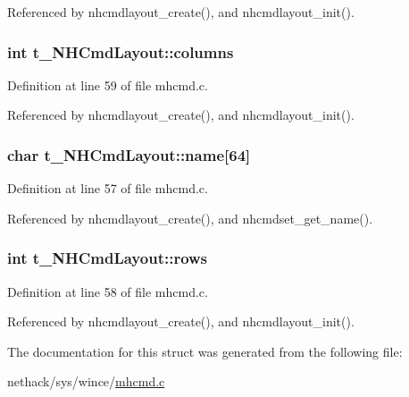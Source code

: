Referenced by nhcmdlayout\+\_\+create(), and nhcmdlayout\+\_\+init().

\hypertarget{structt__NHCmdLayout_ae49b667aa9339a89e4bc0d15881506ca}{
\subsubsection[{columns}]{\setlength{\rightskip}{0pt plus 5cm}int t\+\_\+\+N\+H\+Cmd\+Layout\+::columns}}\label{structt__NHCmdLayout_ae49b667aa9339a89e4bc0d15881506ca}


Definition at line 59 of file mhcmd.\+c.



Referenced by nhcmdlayout\+\_\+create(), and nhcmdlayout\+\_\+init().

\hypertarget{structt__NHCmdLayout_a0545015938cf16c21bb813d4fe075ed7}{
\subsubsection[{name}]{\setlength{\rightskip}{0pt plus 5cm}char t\+\_\+\+N\+H\+Cmd\+Layout\+::name\mbox{[}64\mbox{]}}}\label{structt__NHCmdLayout_a0545015938cf16c21bb813d4fe075ed7}


Definition at line 57 of file mhcmd.\+c.



Referenced by nhcmdlayout\+\_\+create(), and nhcmdset\+\_\+get\+\_\+name().

\hypertarget{structt__NHCmdLayout_a54b0e456d1ffceb26fd2d3e0b7085878}{
\subsubsection[{rows}]{\setlength{\rightskip}{0pt plus 5cm}int t\+\_\+\+N\+H\+Cmd\+Layout\+::rows}}\label{structt__NHCmdLayout_a54b0e456d1ffceb26fd2d3e0b7085878}


Definition at line 58 of file mhcmd.\+c.



Referenced by nhcmdlayout\+\_\+create(), and nhcmdlayout\+\_\+init().



The documentation for this struct was generated from the following file\+:\begin{DoxyCompactItemize}
\item 
nethack/sys/wince/\hyperlink{mhcmd_8c}{mhcmd.\+c}\end{DoxyCompactItemize}
